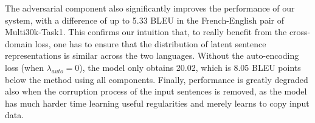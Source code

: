 The adversarial component also significantly improves the performance of our system, with a difference of up to 5.33 BLEU in the French-English pair of Multi30k-Task1. This confirms our intuition that, to really benefit from the cross-domain loss, one has to ensure that the distribution of latent sentence representations is similar across the two languages. Without the auto-encoding loss (when $\lambda_{auto}=0$), the model only obtains 20.02, which is 8.05 BLEU points below the method using all components. Finally, performance is greatly degraded also when the corruption process of the input sentences is removed, as the model has much harder time learning useful regularities and merely learns to copy input data.
